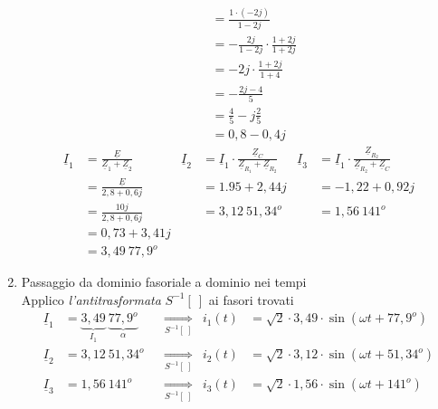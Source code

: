 \documentclass{article}
\begin{document}
\begin{enumerate}[label=\protect\circled{\arabic*}]
\begin{align*}
        \\
        & &
        &=\frac{1 \cdot (-2j)}{1 -2j}
        \\
        & &
        &= -\frac{2j}{1-2j} \cdot \frac{1+2j}{1+2j}
        \\
        & &
        &=-2j \cdot \frac{1+2j}{1+4}
        \\
        & &
        &=-\frac{2j-4}{5}
        \\
        & &
        &= \frac{4}{5} - j \frac{2}{5}
        \\
        & & 
        &= 0,8 -0,4j
    \end{align*}
    \begin{align*}
        \underline{I}_1 &= \frac{\underline{E}}{\underline{Z}_1+\underline{Z}_2} &
        \underline{I}_2 &= \underline{I}_1 \cdot \frac{\underline{Z}_C}{\underline{Z}_{R_1}+\underline{Z}_{R_2}} &
        \underline{I}_3&= \underline{I}_1 \cdot \frac{\underline{Z}_{R_2}}{\underline{Z}_{R_2}+\underline{Z}_C}
        \\
        &=\frac{\underline{E}}{2,8+0,6j} &
        &= 1.95 + 2,44j &
        &= -1,22 + 0,92j
        \\
        &=\frac{10j}{2,8+0,6j} &
        &=3,12 \ \boxed{51,34^o} &
        &= 1,56 \ \boxed{141^o}
        \\
        &=0,73 + 3,41j
        \\
        &=3,49 \ \boxed{77,9 ^o}
    \end{align*}
    
    \item Passaggio da dominio fasoriale a dominio nei tempi
    \vspace*{0.2cm}\\
    Applico \textit{l'antitrasformata} $S^{-1}[ \ ]$ ai fasori trovati
    \begin{align*}
        \underline{I}_1 &= \underbrace{3,49}_{I_1} \ \underbrace{\boxed{77,9 ^o}}_{\alpha} &
        &\underset{S^{-1} [\ ]}{\Longrightarrow} &
        i_1(t) &= \sqrt{2} \cdot 3,49 \cdot \sin(\omega t + 77,9 ^o)
        \\
        \underline{I}_2 &= 3,12 \ \boxed{51,34^o} &
        &\underset{S^{-1} [\ ]}{\Longrightarrow} &
        i_2(t) &= \sqrt{2} \cdot 3,12 \cdot \sin(\omega t + 51,34 ^o)
        \\
        \underline{I}_3 &= 1,56 \ \boxed{141^o} &
        &\underset{S^{-1} [\ ]}{\Longrightarrow} &
        i_3(t) &= \sqrt{2} \cdot 1,56 \cdot \sin(\omega t + 141 ^o)
    \end{align*}
\end{enumerate}
\end{document}
